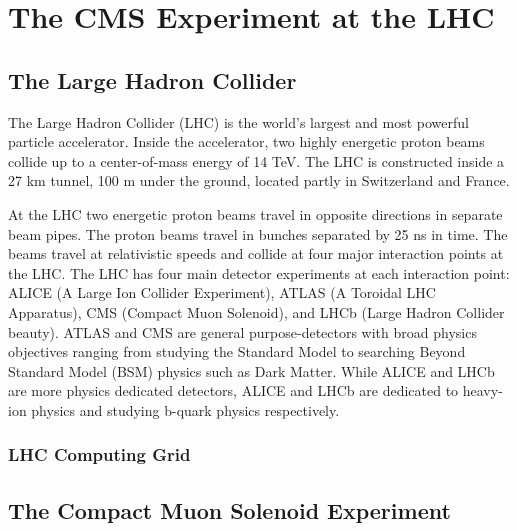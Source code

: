 \chapter{The CMS Experiment at the LHC}
\label{chapter:three}
\section{The Large Hadron Collider}

The Large Hadron Collider (LHC) is the world’s largest and most powerful particle accelerator. Inside the accelerator, two highly energetic proton beams collide up to a center-of-mass energy of 14 TeV. The LHC is constructed inside a 27 km tunnel, 100 m under the ground, located partly in Switzerland and France.

At the LHC two energetic proton beams travel in opposite directions in separate beam pipes. The proton beams travel in bunches separated by 25 ns in time. The beams travel at relativistic speeds and collide at four major interaction points at the LHC. The LHC has four main detector experiments at each interaction point: ALICE (A Large Ion Collider Experiment), ATLAS (A Toroidal LHC Apparatus), CMS (Compact Muon Solenoid), and LHCb (Large Hadron Collider beauty). ATLAS and CMS are general purpose-detectors with broad physics objectives ranging from studying the Standard Model to searching Beyond Standard Model (BSM) physics such as Dark Matter. While ALICE and LHCb are more physics dedicated detectors, ALICE and LHCb are dedicated to heavy-ion physics and studying b-quark physics respectively.
\subsection{LHC Computing Grid}





\section{The Compact Muon Solenoid Experiment}
